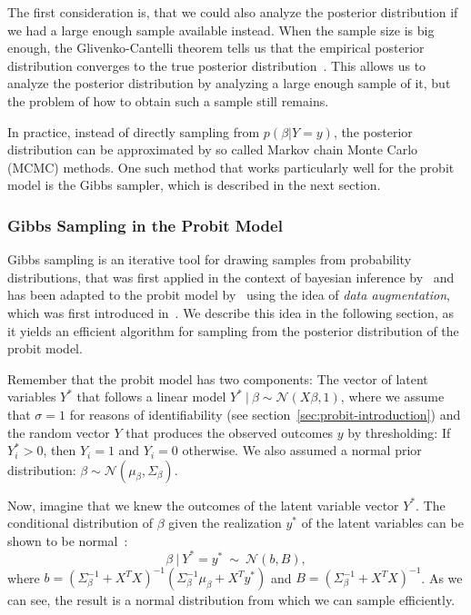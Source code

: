 The first consideration is, that we could also analyze the posterior
distribution if we had a large enough sample available instead.
When the sample size is big enough, the Glivenko-Cantelli theorem
tells us that the empirical posterior distribution converges
to the true posterior distribution~\cite{glivenko-cantelli}.
This allows us to analyze the posterior
distribution by analyzing a large enough sample of it,
but the problem of how to obtain such a sample still remains.

In practice, instead of directly sampling from $p(\beta | Y=y)$,
the posterior distribution can be approximated by so called
Markov chain Monte Carlo (MCMC) methods.
One such method that works particularly well for the probit model
is the Gibbs sampler, which is described in the next section.

\subsubsection{Gibbs Sampling in the Probit Model}

Gibbs sampling is an iterative tool for drawing samples from
probability distributions, that was first applied in the
context of bayesian
inference by~\cite{gibbs-sampler} and has been adapted to the
probit model by~\cite{gibbs-probit-albert-chib} using the idea
of \textit{data augmentation}, which was first introduced
in~\cite{data-augmentation}.
We describe this idea in the following section, as it yields
an efficient algorithm for sampling from the posterior
distribution of the probit model.

Remember that the probit model has two components: The vector of latent
variables $Y^\ast$ that follows a linear model
$Y^\ast\ |\ \beta\sim \mathcal{N}(X \beta, 1)$, where we assume that $\sigma=1$
for reasons of identifiability (see section~\ref{sec:probit-introduction})
and the random vector $Y$ that produces the observed outcomes $y$ by
thresholding: If $Y_i^\ast > 0$, then $Y_i=1$ and $Y_i=0$ otherwise.
We also assumed a normal prior distribution:
$\beta \sim \mathcal{N}(\mu_\beta, \Sigma_\beta)$.

Now, imagine that we knew the outcomes of the latent variable vector $Y^\ast$.
The conditional distribution of $\beta$ given the realization $y^\ast$
of the latent variables can be shown to be normal~\cite{gibbs-probit-albert-chib}:
\begin{equation}
    \label{eq:gibbs-normal}
    \beta\ |\ Y^\ast = y^\ast\ \sim\ \mathcal{N}(b, B),
\end{equation}
where
$b = (\Sigma_\beta^{-1} + X^TX)^{-1}(\Sigma_\beta^{-1} \mu_\beta + X^T y^\ast)$
and
$B = (\Sigma_\beta^{-1} + X^TX)^{-1}$.
As we can see, the result is a normal distribution from which we can
sample efficiently.

